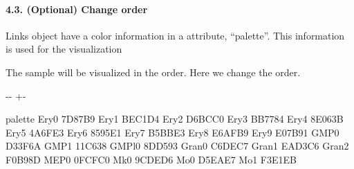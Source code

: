 \documentclass[letterpaper,10pt,english]{sphinxmanual}
\newlength\nbsphinxcodecellspacing
\begin{document}
\paragraph{4.3. (Optional) Change order}
\label{\detokenize{notebooks/04_Network_analysis/Network_analysis_with_with_Paul_etal_2015_data:4.3.-(Optional)-Change-order}}
Links object have a color information in a attribute, “palette”. This information is used for the visualization

The sample will be visualized in the order. Here we change the order.

{
%
\begin{sphinxVerbatim}[commandchars=\\\{\}]
\llap{\color{nbsphinxin}[16]:\,\hspace{\fboxrule}\hspace{\fboxsep}}
\end{sphinxVerbatim}
}

{

\kern-\sphinxverbatimsmallskipamount\kern-\baselineskip
\kern+\FrameHeightAdjust\kern-\fboxrule
\vspace{\nbsphinxcodecellspacing}

%
\begin{sphinxVerbatim}[commandchars=\\\{\}]
\llap{\color{nbsphinxout}[16]:\,\hspace{\fboxrule}\hspace{\fboxsep}}        palette
Ery\PYGZus{}0   \PYGZsh{}7D87B9
Ery\PYGZus{}1   \PYGZsh{}BEC1D4
Ery\PYGZus{}2   \PYGZsh{}D6BCC0
Ery\PYGZus{}3   \PYGZsh{}BB7784
Ery\PYGZus{}4   \PYGZsh{}8E063B
Ery\PYGZus{}5   \PYGZsh{}4A6FE3
Ery\PYGZus{}6   \PYGZsh{}8595E1
Ery\PYGZus{}7   \PYGZsh{}B5BBE3
Ery\PYGZus{}8   \PYGZsh{}E6AFB9
Ery\PYGZus{}9   \PYGZsh{}E07B91
GMP\PYGZus{}0   \PYGZsh{}D33F6A
GMP\PYGZus{}1   \PYGZsh{}11C638
GMPl\PYGZus{}0  \PYGZsh{}8DD593
Gran\PYGZus{}0  \PYGZsh{}C6DEC7
Gran\PYGZus{}1  \PYGZsh{}EAD3C6
Gran\PYGZus{}2  \PYGZsh{}F0B98D
MEP\PYGZus{}0   \PYGZsh{}0FCFC0
Mk\PYGZus{}0    \PYGZsh{}9CDED6
Mo\PYGZus{}0    \PYGZsh{}D5EAE7
Mo\PYGZus{}1    \PYGZsh{}F3E1EB
\end{sphinxVerbatim}
}
\end{document}
